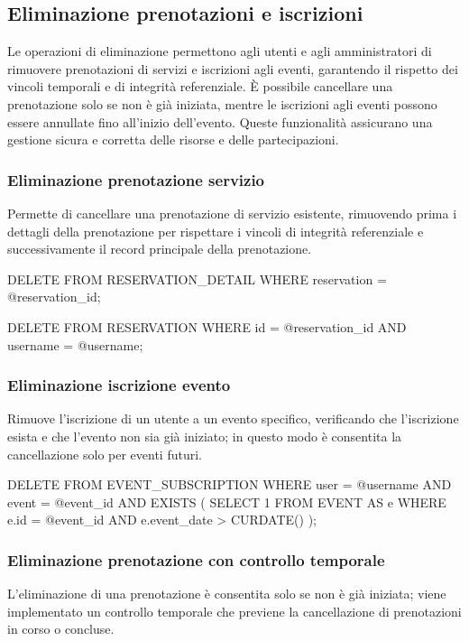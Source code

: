 \documentclass[a4paper,12pt]{report}
\begin{document}
\newpage
\subsection{Eliminazione prenotazioni e iscrizioni}
Le operazioni di eliminazione permettono agli utenti e agli
amministratori di rimuovere prenotazioni di servizi e iscrizioni agli
eventi, garantendo il rispetto dei vincoli temporali e di integrità
referenziale. È possibile cancellare una prenotazione solo se non è
già iniziata, mentre le iscrizioni agli eventi possono essere
annullate fino all'inizio dell'evento. Queste funzionalità assicurano
una gestione sicura e corretta delle risorse e delle partecipazioni.

\subsubsection{Eliminazione prenotazione servizio}
Permette di cancellare una prenotazione di servizio esistente,
rimuovendo prima i dettagli della prenotazione per rispettare i
vincoli di integrità referenziale e successivamente il record
principale della prenotazione.

\begin{sqlcode}[caption={}]
DELETE FROM RESERVATION_DETAIL
WHERE reservation = @reservation_id;

DELETE FROM RESERVATION
WHERE id = @reservation_id
AND username = @username;
\end{sqlcode}

\subsubsection{Eliminazione iscrizione evento}
Rimuove l'iscrizione di un utente a un evento specifico, verificando
che l'iscrizione esista e che l'evento non sia già iniziato; in
questo modo è consentita la cancellazione solo per eventi futuri.

\begin{sqlcode}[caption={}]
DELETE FROM EVENT_SUBSCRIPTION
WHERE
  user = @username
  AND event = @event_id
  AND EXISTS (
    SELECT 1
    FROM EVENT AS e
    WHERE
      e.id = @event_id
      AND e.event_date > CURDATE()
  );
\end{sqlcode}

\subsubsection{Eliminazione prenotazione con controllo temporale}
L'eliminazione di una prenotazione è consentita solo se non è già
iniziata; viene implementato un controllo temporale che previene la
cancellazione di prenotazioni in corso o concluse.
\end{document}
